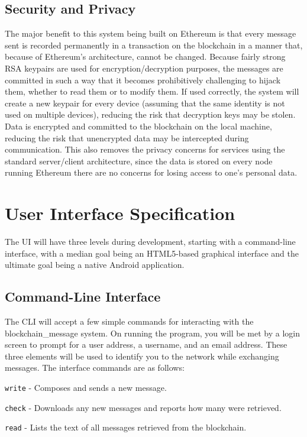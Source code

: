 \documentclass[titlepage]{report}
\begin{document}
\subsection{Security and Privacy}
The major benefit to this system being built on Ethereum is that every message sent is recorded permanently in a transaction on the blockchain in a manner that, because of Ethereum's architecture, cannot be changed. Because fairly strong RSA keypairs are used for encryption/decryption purposes, the messages are committed in such a way that it becomes prohibitively challenging to hijack them, whether to read them or to modify them. If used correctly, the system will create a new keypair for every device (assuming that the same identity is not used on multiple devices), reducing the risk that decryption keys may be stolen. Data is encrypted and committed to the blockchain on the local machine, reducing the risk that unencrypted data may be intercepted during communication. This also removes the privacy concerns for services using the standard server/client architecture, since the data is stored on every node running Ethereum there are no concerns for losing access to one's personal data.

\section{User Interface Specification}
The UI will have three levels during development, starting with a command-line interface, with a median goal being an HTML5-based graphical interface and the ultimate goal being a native Android application.

\subsection{Command-Line Interface}
The CLI will accept a few simple commands for interacting with the blockchain\_message system. On running the program, you will be met by a login screen to prompt for a user address, a username, and an email address. These three elements will be used to identify you to the network while exchanging messages.
The interface commands are as follows:

\texttt{write} - Composes and sends a new message.

\texttt{check} - Downloads any new messages and reports how many were retrieved.

\texttt{read} - Lists the text of all messages retrieved from the blockchain.
\end{document}
